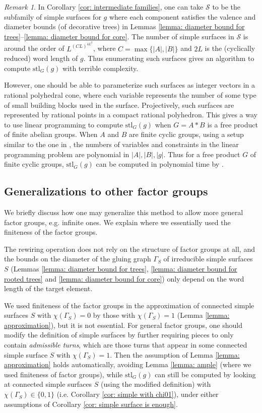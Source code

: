 \documentclass{amsart}
\theoremstyle{definition}
\numberwithin{equation}{section}
\theoremstyle{theorem}
\theoremstyle{remark}
\newtheorem{remark}[theorem]{Remark}
\def\stl{\mathrm{stl}}
\begin{document}
	\begin{remark}\label{remark: complexity}
		In Corollary \ref{cor: intermediate families}, one can take $\mathcal{S}$ to be the subfamily of simple surfaces for $g$ where each component satisfies the valence and diameter bounds (of decorative trees) in Lemmas \ref{lemma: diameter bound for trees}--\ref{lemma: diameter bound for core}. The number of simple surfaces in $\mathcal{S}$ is around the order of $L^{{(C L)}^{4L^2}}$, where $C=\max\{|A|,|B|\}$ and $2L$ is the (cyclically reduced) word length of $g$. Thus enumerating	such surfaces gives an algorithm to compute $\stl_G(g)$ with terrible complexity.
		
		However, one should be able to parameterize such surfaces as integer vectors in a rational polyhedral cone, where each variable represents the number of some type of small building blocks used in the surface.
		Projectively, such surfaces are represented by rational points in a compact rational polyhedron.
		This gives a way to use linear programming to compute $\stl_G(g)$ when $G=A*B$ is a free product of finite abelian groups. When $A$ and $B$ are finite cyclic groups, using a setup similar to the one in \cite{Alden}, the numbers of variables and constraints in the linear programming problem are polynomial in $|A|, |B|, |g|$. Thus for a free product $G$ of finite cyclic groups, $\stl_G(g)$ can be computed in polynomial time by \cite{linprog}.
	\end{remark}


	\subsection{Generalizations to other factor groups}\label{subsec: generalization}
	We briefly discuss how one may generalize this method to allow more general factor groups, e.g. infinite ones. We explain where we essentially used the finiteness of the factor groups.
	
	The rewiring operation does not rely on the structure of factor groups at all, and the bounds on the diameter of the gluing graph $\Gamma_S$ of irreducible simple surfaces $S$ (Lemmas \ref{lemma: diameter bound for trees}, \ref{lemma: diameter bound for rooted trees} and \ref{lemma: diameter bound for core}) only depend on the word length of the target element.
	
	We used finiteness of the factor groups in the approximation of connected simple surfaces $S$ with $\chi(\Gamma_S)=0$ by those with $\chi(\Gamma_S)=1$ (Lemma \ref{lemma: approximation}), but it is not essential. For general factor groups, one should modify the definition of simple surfaces by further requiring pieces to only contain \emph{admissible turns}, which are those turns that appear in some connected simple surface $S$ with $\chi(\Gamma_S)=1$.
	Then the assumption of Lemma \ref{lemma: approximation} holds automatically, avoiding Lemma \ref{lemma: ample} (where we used finiteness of factor groups), while $\stl_G(g)$ can still be computed by looking at connected simple surfaces $S$ (using the modified definition) with $\chi(\Gamma_S)\in\{0,1\}$ (i.e. Corollary \ref{cor: simple with chi01}), under either assumptions of Corollary \ref{cor: simple surface is enough}.
	
\end{document}
